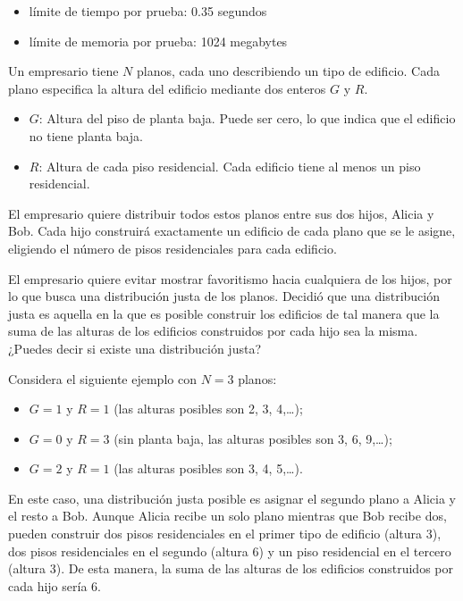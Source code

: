 \documentclass{article}
\begin{document}
\begin{itemize}
    \item límite de tiempo por prueba: 0.35 segundos
    \item límite de memoria por prueba: 1024 megabytes
\end{itemize}

Un empresario tiene $N$ planos, cada uno describiendo un tipo de edificio. Cada plano especifica la altura del edificio mediante dos enteros $G$ y $R$.

\begin{itemize}
    \item $G$: Altura del piso de planta baja. Puede ser cero, lo que indica que el edificio no tiene planta baja.
    \item $R$: Altura de cada piso residencial. Cada edificio tiene al menos un piso residencial.
\end{itemize}

El empresario quiere distribuir todos estos planos entre sus dos hijos, Alicia y Bob. Cada hijo construirá exactamente un edificio de cada plano que se le asigne, eligiendo el número de pisos residenciales para cada edificio.

El empresario quiere evitar mostrar favoritismo hacia cualquiera de los hijos, por lo que busca una distribución justa de los planos. Decidió que una distribución justa es aquella en la que es posible construir los edificios de tal manera que la suma de las alturas de los edificios construidos por cada hijo sea la misma. ¿Puedes decir si existe una distribución justa?

Considera el siguiente ejemplo con $N=3$ planos:

\begin{itemize}
    \item $G=1$ y $R=1$ (las alturas posibles son 2, 3, 4,…);
    \item $G=0$ y $R=3$ (sin planta baja, las alturas posibles son 3, 6, 9,…);
    \item $G=2$ y $R=1$ (las alturas posibles son 3, 4, 5,…).
\end{itemize}

En este caso, una distribución justa posible es asignar el segundo plano a Alicia y el resto a Bob.
Aunque Alicia recibe un solo plano mientras que Bob recibe dos, pueden construir dos pisos residenciales en el primer tipo de edificio (altura 3), dos pisos residenciales en el segundo (altura 6) y un piso residencial en el tercero (altura 3). De esta manera, la suma de las alturas de los edificios construidos por cada hijo sería 6.\\
\end{document}
